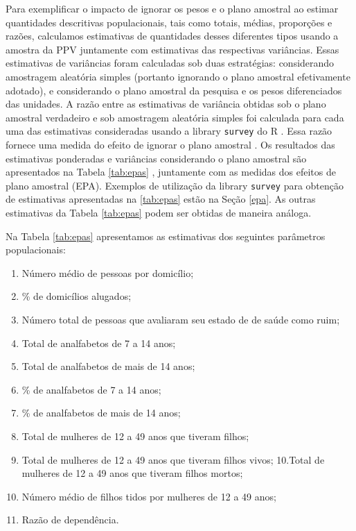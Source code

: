 \documentclass[]{book}
\providecommand{\tightlist}{%
  \setlength{\itemsep}{0pt}\setlength{\parskip}{0pt}}
\theoremstyle{definition}
\theoremstyle{definition}
\theoremstyle{remark}
\begin{document}
Para exemplificar o impacto de ignorar os pesos e o plano amostral ao
estimar quantidades descritivas populacionais, tais como totais, médias,
proporções e razões, calculamos estimativas de quantidades desses
diferentes tipos usando a amostra da PPV juntamente com estimativas das
respectivas variâncias. Essas estimativas de variâncias foram calculadas
sob duas estratégias: considerando amostragem aleatória simples
(portanto ignorando o plano amostral efetivamente adotado), e
considerando o plano amostral da pesquisa e os pesos diferenciados das
unidades. A razão entre as estimativas de variância obtidas sob o plano
amostral verdadeiro e sob amostragem aleatória simples foi calculada
para cada uma das estimativas consideradas usando a library
\texttt{survey} do R \citep{R-survey} . Essa razão fornece uma medida do
efeito de ignorar o plano amostral . Os resultados das estimativas
ponderadas e variâncias considerando o plano amostral são apresentados
na Tabela \ref{tab:epas} , juntamente com as medidas dos efeitos de
plano amostral (EPA). Exemplos de utilização da library \texttt{survey}
para obtenção de estimativas apresentadas na \ref{tab:epas} estão na
Seção \ref{epa}. As outras estimativas da Tabela \ref{tab:epas} podem
ser obtidas de maneira análoga.

Na Tabela \ref{tab:epas} apresentamos as estimativas dos seguintes
parâmetros populacionais:

\begin{enumerate}
\def\labelenumi{\arabic{enumi}.}
\tightlist
\item
  Número médio de pessoas por domicílio;
\item
  \% de domicílios alugados;
\item
  Número total de pessoas que avaliaram seu estado de de saúde como
  ruim;
\item
  Total de analfabetos de 7 a 14 anos;
\item
  Total de analfabetos de mais de 14 anos;
\item
  \% de analfabetos de 7 a 14 anos;
\item
  \% de analfabetos de mais de 14 anos;
\item
  Total de mulheres de 12 a 49 anos que tiveram filhos;
\item
  Total de mulheres de 12 a 49 anos que tiveram filhos vivos; 10.Total
  de mulheres de 12 a 49 anos que tiveram filhos mortos;
\item
  Número médio de filhos tidos por mulheres de 12 a 49 anos;
\item
  Razão de dependência.
\end{enumerate}
\end{document}
